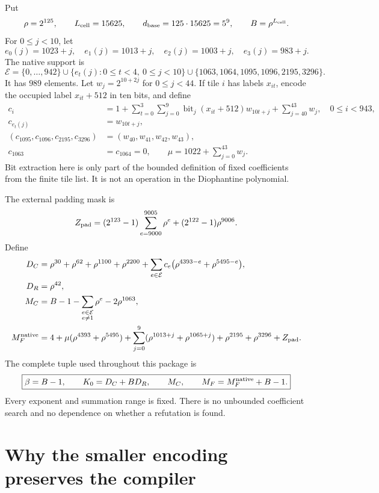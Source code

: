 \documentclass[11pt,a4paper]{article}
\theoremstyle{remark}\newtheorem{remark}[theorem]{Remark}
\begin{document}
Put
\[
 \rho=2^{125},\qquad L_{\rm cell}=15625,\qquad
 d_{\rm base}=125\cdot15625=5^9,
 \qquad B=\rho^{L_{\rm cell}}.
\]
For $0\le j<10$, let
\[
 e_0(j)=1023+j,\quad e_1(j)=1013+j,\quad
 e_2(j)=1003+j,\quad e_3(j)=983+j.
\]
The native support is
\[
 \mathcal E=\{0,\ldots,942\}\cup
 \{e_t(j):0\le t<4,\ 0\le j<10\}
 \cup\{1063,1064,1095,1096,2195,3296\}.
\]
It has $989$ elements. Let $w_j=2^{10+2j}$ for $0\le j<44$.
If tile $i$ has labels $x_{it}$, encode the occupied label $x_{it}+512$
in ten bits, and define
\begin{align*}
 c_i&=1+\sum_{t=0}^3\sum_{j=0}^9
          \operatorname{bit}_j(x_{it}+512)w_{10t+j}
             +\sum_{j=40}^{43}w_j,\quad 0\le i<943,\\
 c_{e_t(j)}&=w_{10t+j},\\
 (c_{1095},c_{1096},c_{2195},c_{3296})&=(w_{40},w_{41},w_{42},w_{43}),\\
 c_{1063}&=c_{1064}=0,\qquad
 \mu=1022+\sum_{j=0}^{43}w_j.
\end{align*}
Bit extraction here is only part of the bounded definition of fixed
coefficients from the finite tile list. It is not an operation in the
Diophantine polynomial.

The external padding mask is
\[
 Z_{\rm pad}=(2^{123}-1)\sum_{e=9000}^{9005}\rho^e
                  +(2^{122}-1)\rho^{9006}.
\]
Define
\begin{align}
 D_C={}&\rho^{30}+\rho^{62}+\rho^{1100}+\rho^{2200}
       +\sum_{e\in\mathcal E}c_e
          \bigl(\rho^{4393-e}+\rho^{5495-e}\bigr),\notag\\
 D_R={}&\rho^{42},\notag\\
 M_C={}&B-1-\sum_{\substack{e\in\mathcal E\\e\ne1}}\rho^e
                       -2\rho^{1063},\notag\\
 M_F^{\rm native}={}&4+\mu(\rho^{4393}+\rho^{5495})
  +\sum_{j=0}^9(\rho^{1013+j}+\rho^{1065+j})
  +\rho^{2195}+\rho^{3296}+Z_{\rm pad}.\label{eq:constants}
\end{align}
The complete tuple used throughout this package is
\begin{equation}
 \boxed{\beta=B-1,\qquad K_0=D_C+BD_R,\qquad
          M_C,\qquad M_F=M_F^{\rm native}+B-1.}
 \label{eq:ports}
\end{equation}
Every exponent and summation range is fixed. There is no unbounded
coefficient search and no dependence on whether a refutation is found.

\section{Why the smaller encoding preserves the compiler}
\label{sec:adapterproof}
\end{document}
